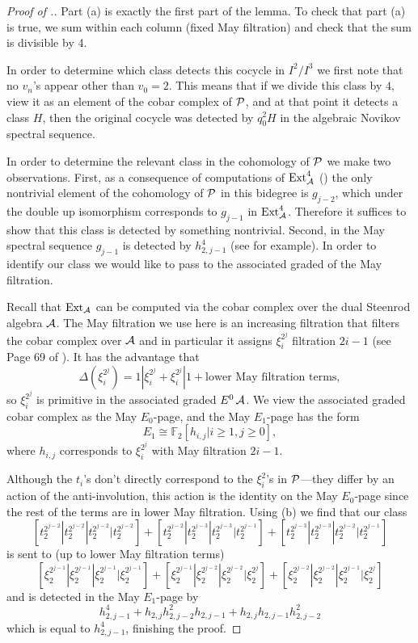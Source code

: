 \begin{proof}[Proof of .]
  Part (a) is exactly the first part of the lemma.
  To check that part (a) is true, we sum within each column (fixed May filtration) and check that the sum is divisible by 4.
  
  In order to determine which class detects this cocycle in $I^2/I^3$ we first note that no $v_n$'s appear other than $v_0=2$. This means that if we divide this class by $4$, view it as an element of the cobar complex of $\P$, and at that point it detects a class $H$, then the original cocycle was detected by $q_0^2H$ in the algebraic Novikov spectral sequence.

  In order to determine the relevant class in the cohomology of $\P$ we make two observations.
  First, as a consequence of computations of $\Ext_{\A}^4$ (\cite{LinExt}) the only nontrivial element of the cohomology of $\P$ in this bidegree is $g_{j-2}$, which under the double up isomorphism corresponds to $g_{j-1}$ in $\Ext_{\A}^4$. Therefore it suffices to show that this class is detected by something nontrivial.
  Second, in the May spectral sequence $g_{j-1}$ is detected by $h_{2,j-1}^4$ (see \cite{TangoraExt, RavenelGreenBook} for example).
  In order to identify our class we would like to pass to the associated graded of the May filtration.
  
  Recall that $\Ext_{\A}$ can be computed via the cobar complex over the dual Steenrod algebra $\A$. The May filtration we use here is an increasing filtration that filters the cobar complex over $\A$ and in particular it assigns $\xi_i^{2^j}$ filtration $2i-1$ (see Page 69 of \cite{RavenelGreenBook}). It has the advantage that 
  $$\Delta(\xi_i^{2^j}) = 1|\xi_i^{2^j} + \xi_i^{2^j}|1 + \text{lower May filtration terms},$$
  so $\xi_i^{2^j}$ is primitive in the associated graded $E^0 \A$. 
We view the associated graded cobar complex as the May $E_0$-page, and the May $E_1$-page has the form
$$E_1 \cong \mathbb{F}_2[h_{i,j}| i\geq 1, j \geq 0],$$
where $h_{i,j}$ corresponds to $\xi_i^{2^j}$ with May filtration $2i-1$.
  
  
Although the $t_i$'s don't directly correspond to the $\xi_i^2$'s in $\P$---they differ by an action of the anti-involution, this action is the identity on the May $E_0$-page since the rest of the terms are in lower May filtration. 
  Using (b) we find that our class
      \[ [t_2^{2^{j-2}} | t_2^{2^{j-2}} | t_2^{2^{j-2}} | t_2^{2^{j-2}}]
    + [t_2^{2^{j-2}} | t_2^{2^{j-3}} | t_2^{2^{j-3}} | t_2^{2^{j-1}}]
    + [t_2^{2^{j-3}} | t_2^{2^{j-3}} | t_2^{2^{j-2}} | t_2^{2^{j-1}}]\]
   is sent to (up to lower May filtration terms)
    \[ [\xi_2^{2^{j-1}} | \xi_2^{2^{j-1}} | \xi_2^{2^{j-1}} | \xi_2^{2^{j-1}}]
    + [\xi_2^{2^{j-1}} | \xi_2^{2^{j-2}} | \xi_2^{2^{j-2}} | \xi_2^{2^{j}}]
    + [\xi_2^{2^{j-2}} | \xi_2^{2^{j-2}} | \xi_2^{2^{j-1}} | \xi_2^{2^{j}}] \]
   and is detected in the May $E_1$-page by 
  \[ h_{2,j-1}^4 + h_{2,j}h_{2,j-2}^2h_{2,j-1}  + h_{2,j}h_{2,j-1}h_{2,j-2}^2 \]
  which is equal to $h_{2,j-1}^4$, finishing the proof.
\end{proof}
\endgroup

